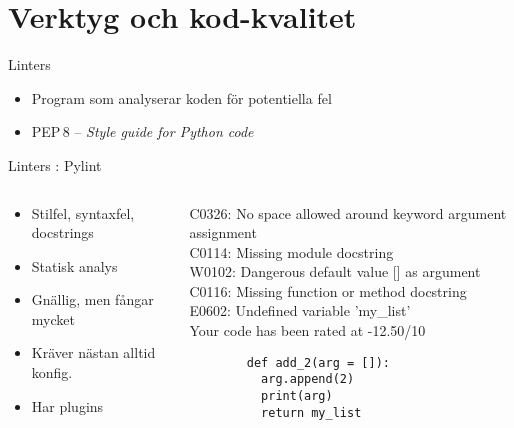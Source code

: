 \section{Verktyg och kod-kvalitet}

\begin{frame}{Linters}
    \begin{itemize}
      \item Program som analyserar koden för potentiella fel
      \item PEP\,8 -- \textit{Style guide for Python code}
    \end{itemize}
\end{frame}

\begin{frame}[fragile]{Linters : Pylint}
  \begin{columns}
    \begin{column}{0.6\linewidth}
      \begin{itemize}
        \item Stilfel, syntaxfel, docstrings
        \item Statisk analys
        \item Gnällig, men fångar mycket
        \item Kräver nästan alltid konfig.
        \item Har plugins
      \end{itemize}
    \end{column}

    \begin{column}{0.4\linewidth}
      {\ttfamily\tiny
        C0326: No space allowed around keyword argument assignment\\
        C0114: Missing module docstring\\
        W0102: Dangerous default value [] as argument\\
        C0116: Missing function or method docstring\\
        E0602: Undefined variable 'my\_list'\\
        Your code has been rated at -12.50/10
      }

      \begin{verbatim}
        def add_2(arg = []):
          arg.append(2)
          print(arg)
          return my_list
      \end{verbatim}
    \end{column}
  \end{columns}
\end{frame}

